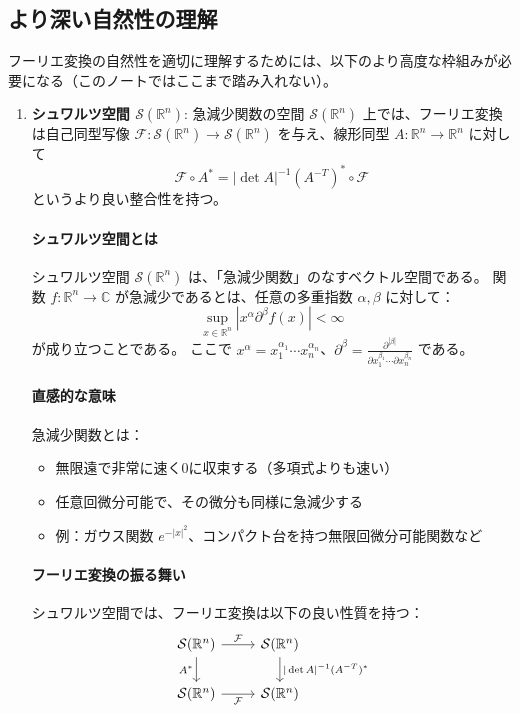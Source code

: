\documentclass[uplatex,a4j,12pt,dvipdfmx]{jsarticle}
\begin{document}
\subsection{より深い自然性の理解}

フーリエ変換の自然性を適切に理解するためには、以下のより高度な枠組みが必要になる（このノートではここまで踏み入れない）。

\begin{enumerate}
	\item \textbf{シュワルツ空間 $\mathcal{S}(\mathbb{R}^n)$}:
	      急減少関数の空間 $\mathcal{S}(\mathbb{R}^n)$ 上では、フーリエ変換は自己同型写像 $\mathcal{F}: \mathcal{S}(\mathbb{R}^n) \to \mathcal{S}(\mathbb{R}^n)$ を与え、線形同型 $A: \mathbb{R}^n \to \mathbb{R}^n$ に対して
	      \[
		      \mathcal{F} \circ A^* = |\det A|^{-1} (A^{-T})^* \circ \mathcal{F}
	      \]
	      というより良い整合性を持つ。



	      \paragraph{シュワルツ空間とは}
	      シュワルツ空間 $\mathcal{S}(\mathbb{R}^n)$ は、「急減少関数」のなすベクトル空間である。
	      関数 $f: \mathbb{R}^n \to \mathbb{C}$ が急減少であるとは、任意の多重指数 $\alpha, \beta$ に対して：
	      \[
		      \sup_{x \in \mathbb{R}^n} |x^\alpha \partial^\beta f(x)| < \infty
	      \]
	      が成り立つことである。
	      ここで $x^\alpha = x_1^{\alpha_1} \cdots x_n^{\alpha_n}$、$\partial^\beta = \frac{\partial^{|\beta|}}{\partial x_1^{\beta_1} \cdots \partial x_n^{\beta_n}}$ である。


	      \paragraph{直感的な意味}
	      急減少関数とは：
	      \begin{itemize}
		      \item 無限遠で非常に速く0に収束する（多項式よりも速い）
		      \item 任意回微分可能で、その微分も同様に急減少する
		      \item 例：ガウス関数 $e^{-|x|^2}$、コンパクト台を持つ無限回微分可能関数など
	      \end{itemize}

	      \paragraph{フーリエ変換の振る舞い}
	      シュワルツ空間では、フーリエ変換は以下の良い性質を持つ：
	      \[
		      \begin{tikzcd}
			      \mathcal{S}(\mathbb{R}^n) \arrow[r, "\mathcal{F}"] \arrow[d, "A^*"']
			      & \mathcal{S}(\mathbb{R}^n) \arrow[d, "|\det A|^{-1} (A^{-T})^*"] \\
			      \mathcal{S}(\mathbb{R}^n) \arrow[r, "\mathcal{F}"']
			      & \mathcal{S}(\mathbb{R}^n)
		      \end{tikzcd}
	      \]


\end{enumerate}
\end{document}
